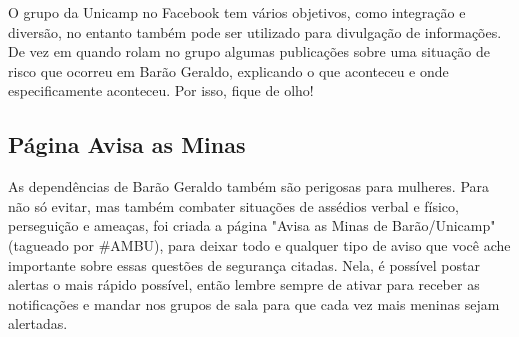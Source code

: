 O grupo da Unicamp no Facebook tem vários objetivos, como integração e diversão,
no entanto também pode ser utilizado para divulgação de informações. De vez em
quando rolam no grupo algumas publicações sobre uma situação de risco que ocorreu
em Barão Geraldo, explicando o que aconteceu e onde especificamente aconteceu. Por
isso, fique de olho!

\subsection{Página Avisa as Minas}

As dependências de Barão Geraldo também são perigosas para mulheres. Para não só
evitar, mas também combater situações de assédios verbal e físico, perseguição e
ameaças, foi criada a página "Avisa as Minas de Barão/Unicamp" (tagueado por \#AMBU),
para deixar todo e qualquer tipo de aviso que você ache importante sobre essas
questões de segurança citadas. Nela, é possível postar alertas o mais rápido possível,
então lembre sempre de ativar para receber as notificações e mandar nos grupos de sala
para que cada vez mais meninas sejam alertadas.